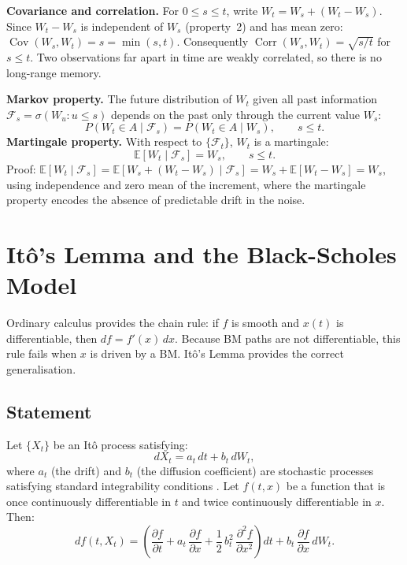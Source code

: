 \textbf{Covariance and correlation.} For $0 \leq s \leq t$, write
$W_t = W_s + (W_t - W_s)$. Since $W_t - W_s$ is independent of $W_s$ (property~2) and has mean zero: \(\operatorname{Cov}(W_s, W_t)=s=\min(s,t)\). Consequently $\operatorname{Corr}(W_s, W_t) = \sqrt{s/t}$ for $s \leq t$.
Two observations far apart in time are weakly correlated, so there is no long-range memory.

\textbf{Markov property.} The future distribution of $W_t$ given all past
information $\mathcal{F}_s = \sigma(W_u : u \leq s)$ depends on the past only
through the current value $W_s$:
\[
    P(W_t \in A \mid \mathcal{F}_s) = P(W_t \in A \mid W_s), \qquad s \leq t.
\]
\textbf{Martingale property.} With respect to $\{\mathcal{F}_t\}$, $W_t$ is a
martingale:
\[
    \mathbb{E}[W_t \mid \mathcal{F}_s] = W_s, \qquad s \leq t.
\]
Proof: $\mathbb{E}[W_t \mid \mathcal{F}_s] = \mathbb{E}[W_s + (W_t - W_s)
\mid \mathcal{F}_s] = W_s + \mathbb{E}[W_t - W_s] = W_s$, using independence
and zero mean of the increment, where the martingale property encodes the absence of predictable drift in the noise.

\section{It\^{o}'s Lemma and the Black-Scholes Model}
\label{app:sec:ito}

Ordinary calculus provides the chain rule: if $f$ is smooth and $x(t)$ is
differentiable, then $df = f'(x)\,dx$. Because BM paths are not differentiable,
this rule fails when $x$ is driven by a BM. It\^{o}'s Lemma provides the correct generalisation.

\subsection{Statement}

Let $\{X_t\}$ be an It\^{o} process satisfying:
\[
    dX_t = a_t\, dt + b_t\, dW_t,
\]
where $a_t$ (the drift) and $b_t$ (the diffusion coefficient) are stochastic processes satisfying standard integrability conditions
\cite{oksendal2003stochastic}. Let $f(t, x)$ be a function that is once
continuously differentiable in $t$ and twice continuously differentiable in $x$.
Then:
\[
    \label{eq:ito_lemma}
    df(t, X_t) = \left(\frac{\partial f}{\partial t}
    + a_t\, \frac{\partial f}{\partial x}
    + \frac{1}{2}\, b_t^2\,
    \frac{\partial^2 f}{\partial x^2}\right)\! dt
    + b_t\, \frac{\partial f}{\partial x}\, dW_t.
\]


